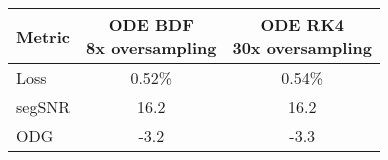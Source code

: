 \begin{tabular}{@{}|l|c|c|@{}}
    \toprule
    Metric & \makecell{\ac{ODE} \acs{BDF}\\8x oversampling} & \makecell{\ac{ODE} \ac{RK}4\\30x oversampling} \\ \midrule
    Loss   & 0.52\% & 0.54\% \\
    segSNR & 16.2 & 16.2 \\
    ODG    & -3.2 & -3.3 \\ \bottomrule
\end{tabular}%
